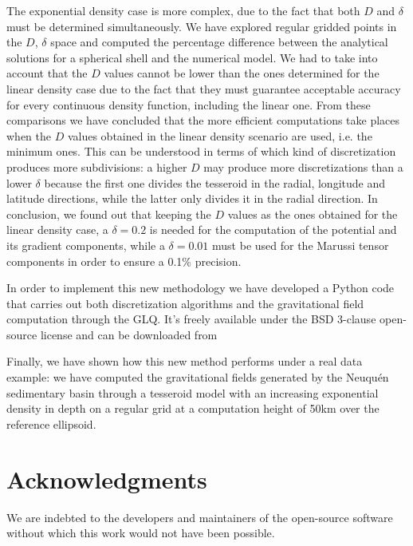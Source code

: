 \documentclass[extra]{gji}
\begin{document}
The exponential density case is more complex, due to the fact that both $D$
and $\delta$ must be determined simultaneously.
We have explored regular gridded points in the $D$, $\delta$ space and
computed the percentage difference between the analytical solutions for a
spherical shell and the numerical model.
We had to take into account that the $D$ values cannot be lower than the ones
determined for the linear density case due to the fact that they must
guarantee acceptable accuracy for every continuous density function, including
the linear one.
From these comparisons we have concluded that the more efficient computations
take places when the $D$ values obtained in the linear density scenario are
used, i.e. the minimum ones.
This can be understood in terms of which kind of discretization produces more
subdivisions: a higher $D$ may produce more discretizations than a lower
$\delta$ because the first one divides the tesseroid in the radial, longitude
and latitude directions, while the latter only divides it in the radial
direction.
In conclusion, we found out that keeping the $D$ values as the ones obtained
for the linear density case, a $\delta = 0.2$ is needed for the computation of
the potential and its gradient components, while a $\delta = 0.01$ must be
used for the Marussi tensor components in order to ensure a 0.1\% precision.

In order to implement this new methodology we have developed a Python code
that carries out both discretization algorithms and the gravitational field
computation through the GLQ. It's freely available under the BSD 3-clause
open-source license and can be downloaded from

Finally, we have shown how this new method performs under a real data example:
we have computed the gravitational fields generated by the Neuqu\'en
sedimentary basin through a tesseroid model with an increasing exponential
density in depth on a regular grid at a computation height of 50km over the
reference ellipsoid.



\section{Acknowledgments}

We are indebted to the developers and maintainers of the open-source
software without which this work would not have been possible.
\end{document}

